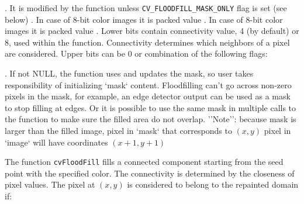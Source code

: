 \begin{description}
. It is modified by the function unless \texttt{CV\_FLOODFILL\_MASK\_ONLY} flag is set (see below)
. In case of 8-bit color images it is packed value
. In case of 8-bit color images it is packed value
. Lower bits contain connectivity value, 4 (by default) or 8, used within the function. Connectivity determines which neighbors of a pixel are considered. Upper bits can be 0 or combination of the following flags:
\begin{description}
\end{description}
. If not NULL, the function uses and updates the mask, so user takes responsibility of initializing `mask` content. Floodfilling can't go across non-zero pixels in the mask, for example, an edge detector output can be used as a mask to stop filling at edges. Or it is possible to use the same mask in multiple calls to the function to make sure the filled area do not overlap. ''Note'': because mask is larger than the filled image, pixel in `mask` that corresponds to $(x,y)$ pixel in `image` will have coordinates $(x+1,y+1)$
\end{description}

The function \texttt{cvFloodFill} fills a connected component starting from the seed point with the specified color. The connectivity is determined by the closeness of pixel values. The pixel at $(x,y)$ is considered to belong to the repainted domain if:

